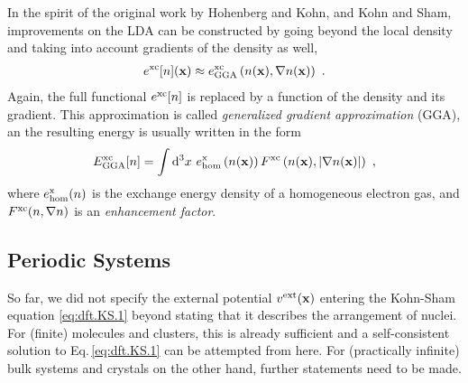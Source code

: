 In the spirit of the original work by Hohenberg and Kohn, and Kohn and Sham, improvements on the LDA can be constructed by going beyond the local density and taking into account gradients of the density as well,
\begin{align}
	e^{\rm xc} [n] ({\bf x})
		\approx e^{\rm xc}_{\rm GGA} \left( n({\bf x}), \nabla n({\bf x}) \right)~.
	\label{eq:dft.exc.gga.1}
\end{align}
Again, the full functional $e^{\rm xc}[n]$ is replaced by a function of the density and its gradient. This approximation is called \emph{generalized gradient approximation} (GGA), an the resulting energy is usually written in the form
\begin{align}
		E^{\rm xc}_{\rm GGA}[n] 
		= \int {\rm d}^3 x ~ e^{\rm x}_{\rm hom} \left(n ({\bf x}) \right) 
			F^{\rm xc} \left(n ({\bf x}), \lvert \nabla n ({\bf x})\rvert \right)~,
		\label{eq:dft.GGA.1}
\end{align}
where $e^{\rm x}_{\rm hom}(n)$ is the exchange energy density of a homogeneous electron gas, and $F^{\rm xc}(n, \nabla n)$ is an \emph{enhancement factor}.

\subsection{Periodic Systems}
\label{sec:theory.periodic.1}
So far, we did not specify the external potential $v^{\rm ext} ({\bf x})$ entering the Kohn-Sham equation \eqref{eq:dft.KS.1} beyond stating that it describes the arrangement of nuclei. For (finite) molecules and clusters, this is already sufficient and a self-consistent solution to Eq.\,\eqref{eq:dft.KS.1} can be attempted from here. For (practically infinite) bulk systems and crystals on the other hand, further statements need to be made.

